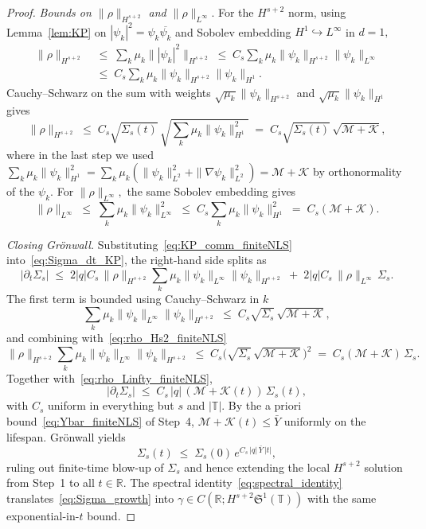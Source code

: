 \documentclass[11pt]{amsart}
\theoremstyle{definition}
\newcommand{\R}{\mathbb{R}}
\newcommand{\T}{\mathbb{T}}
\newcommand{\Sp}{\mathfrak{S}}
\begin{document}
\begin{proof}
\noindent\emph{Bounds on $\|\rho\|_{H^{s+2}}$ and $\|\rho\|_{L^\infty}.$} For the $H^{s+2}$ norm, using Lemma~\ref{lem:KP} on $|\psi_k|^2=\psi_k\overline{\psi_k}$ and Sobolev embedding $H^1\hookrightarrow L^\infty$ in $d=1,$
\[
\begin{aligned}
  \|\rho\|_{H^{s+2}}
  &\;\le\;\sum_k\mu_k\||\psi_k|^2\|_{H^{s+2}}
   \;\le\;C_s\sum_k\mu_k\|\psi_k\|_{H^{s+2}}\|\psi_k\|_{L^\infty}\\
  &\;\le\;C_s\sum_k\mu_k\|\psi_k\|_{H^{s+2}}\|\psi_k\|_{H^1}.
\end{aligned}
\]
Cauchy--Schwarz on the sum with weights $\sqrt{\mu_k}\|\psi_k\|_{H^{s+2}}$ and $\sqrt{\mu_k}\|\psi_k\|_{H^1}$ gives
\begin{equation}\label{eq:rho_Hs2_finiteNLS}
  \|\rho\|_{H^{s+2}}
  \;\le\;C_s\sqrt{\Sigma_s(t)}\,\sqrt{\sum_k\mu_k\|\psi_k\|_{H^1}^2}
  \;=\;C_s\sqrt{\Sigma_s(t)}\,\sqrt{\mathcal{M}+\mathcal{K}},
\end{equation}
where in the last step we used $\sum_k\mu_k\|\psi_k\|_{H^1}^2=\sum_k\mu_k(\|\psi_k\|_{L^2}^2+\|\nabla\psi_k\|_{L^2}^2)=\mathcal{M}+\mathcal{K}$ by orthonormality of the $\psi_k.$ For $\|\rho\|_{L^\infty},$ the same Sobolev embedding gives
\begin{equation}\label{eq:rho_Linfty_finiteNLS}
  \|\rho\|_{L^\infty}\;\le\;\sum_k\mu_k\|\psi_k\|_{L^\infty}^2\;\le\;C_s\sum_k\mu_k\|\psi_k\|_{H^1}^2\;=\;C_s(\mathcal{M}+\mathcal{K}).
\end{equation}

\smallskip

\noindent\emph{Closing Gr\"onwall.} Substituting~\eqref{eq:KP_comm_finiteNLS} into~\eqref{eq:Sigma_dt_KP}, the right-hand side splits as
\[
  |\partial_t\Sigma_s|
  \;\le\;2|q|C_s\,\|\rho\|_{H^{s+2}}\sum_k\mu_k\|\psi_k\|_{L^\infty}\|\psi_k\|_{H^{s+2}}
  \;+\;2|q|C_s\,\|\rho\|_{L^\infty}\,\Sigma_s.
\]
The first term is bounded using Cauchy--Schwarz in $k$
\[
  \sum_k\mu_k\|\psi_k\|_{L^\infty}\|\psi_k\|_{H^{s+2}}
  \;\le\;C_s\sqrt{\Sigma_s}\,\sqrt{\mathcal{M}+\mathcal{K}},
\]
and combining with~\eqref{eq:rho_Hs2_finiteNLS}
\[
  \|\rho\|_{H^{s+2}}\sum_k\mu_k\|\psi_k\|_{L^\infty}\|\psi_k\|_{H^{s+2}}
  \;\le\;C_s\bigl(\sqrt{\Sigma_s}\,\sqrt{\mathcal{M}+\mathcal{K}}\bigr)^{\!2}
  \;=\;C_s(\mathcal{M}+\mathcal{K})\,\Sigma_s.
\]
Together with~\eqref{eq:rho_Linfty_finiteNLS},
\[
  |\partial_t\Sigma_s|\;\le\;C_s\,|q|\,(\mathcal{M}+\mathcal{K}(t))\,\Sigma_s(t),
\]
with $C_s$ uniform in everything but $s$ and $|\T|.$ By the a priori bound~\eqref{eq:Ybar_finiteNLS} of Step~4, $\mathcal{M}+\mathcal{K}(t)\le \bar Y$ uniformly on the lifespan. Gr\"onwall yields
\begin{equation}\label{eq:Sigma_growth}
  \Sigma_s(t)\;\le\;\Sigma_s(0)\,e^{C_s\,|q|\,\bar Y\,|t|},
\end{equation}
ruling out finite-time blow-up of $\Sigma_s$ and hence extending the local $H^{s+2}$ solution from Step~1 to all $t\in\R.$ The spectral identity~\eqref{eq:spectral_identity} translates~\eqref{eq:Sigma_growth} into $\gamma\in C(\R;H^{s+2}\Sp^1(\T))$ with the same exponential-in-$t$ bound.


\end{proof}
\end{document}
